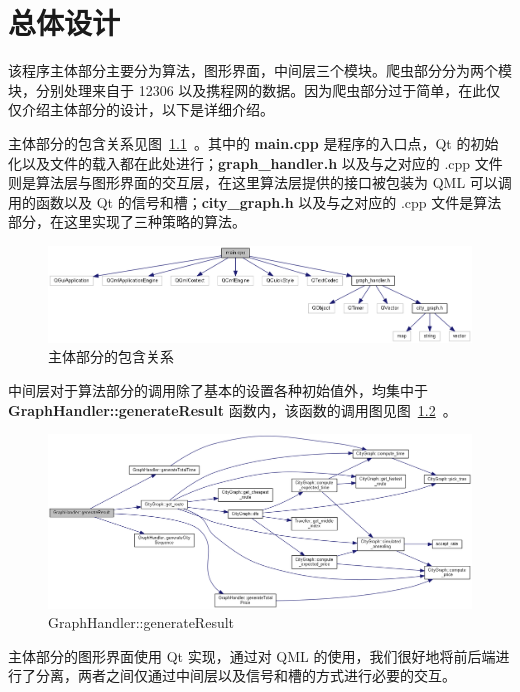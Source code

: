 \documentclass[lang=cn,blue]{elegantbook}
\begin{document}
\chapter{总体设计}

该程序主体部分主要分为算法，图形界面，中间层三个模块。爬虫部分分为两个模块，分别处理来自于 12306 以及携程网的数据。因为爬虫部分过于简单，在此仅仅介绍主体部分的设计，以下是详细介绍。

主体部分的包含关系见图~\ref{main_cpp}~。其中的 \textbf{main.cpp} 是程序的入口点，Qt 的初始化以及文件的载入都在此处进行；\textbf{graph\_handler.h} 以及与之对应的 .cpp 文件则是算法层与图形界面的交互层，在这里算法层提供的接口被包装为 QML 可以调用的函数以及 Qt 的信号和槽；\textbf{city\_graph.h} 以及与之对应的 .cpp 文件是算法部分，在这里实现了三种策略的算法。

\begin{figure}[!htbp]
	\centering
	\includegraphics[width=1\textwidth]{main_8cpp__incl.png}
	\caption{主体部分的包含关系}
	\label{main_cpp}
\end{figure}

中间层对于算法部分的调用除了基本的设置各种初始值外，均集中于 \textbf{GraphHandler::generateResult} 函数内，该函数的调用图见图~\ref{genR}~。

 \begin{figure}[!htbp]
 	\centering
 	\includegraphics[width=1\textwidth]{graph_handler_generateResult.png}
 	\caption{GraphHandler::generateResult}
 	\label{genR}
 \end{figure}

主体部分的图形界面使用 Qt 实现，通过对 QML 的使用，我们很好地将前后端进行了分离，两者之间仅通过中间层以及信号和槽的方式进行必要的交互。
\end{document}
